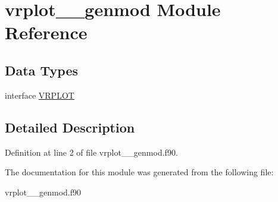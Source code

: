 \hypertarget{classvrplot____genmod}{\section{vrplot\+\_\+\+\_\+genmod Module Reference}
\label{classvrplot____genmod}
}
\subsection*{Data Types}
\begin{DoxyCompactItemize}
\item 
interface \hyperlink{interfacevrplot____genmod_1_1_v_r_p_l_o_t}{V\+R\+P\+L\+O\+T}
\end{DoxyCompactItemize}


\subsection{Detailed Description}


Definition at line 2 of file vrplot\+\_\+\+\_\+genmod.\+f90.



The documentation for this module was generated from the following file\+:\begin{DoxyCompactItemize}
\item 
vrplot\+\_\+\+\_\+genmod.\+f90\end{DoxyCompactItemize}
